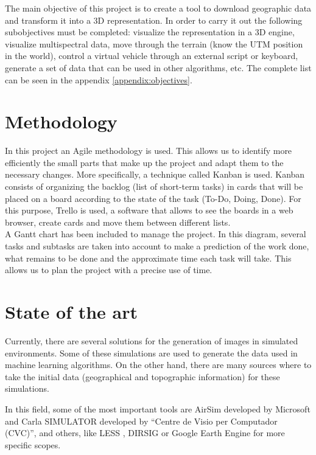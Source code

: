 \documentclass[10pt,a4paper,twocolumn,twoside]{article}
\begin{document}
The main objective of this project is to create a tool to download geographic data and transform it into a 3D representation. In order to carry it out the following subobjectives must be completed: visualize the representation in a 3D engine, visualize multispectral data, move through the terrain (know the UTM position in the world), control a virtual vehicle through an external script or keyboard, generate a set of data that can be used in other algorithms, etc. The complete list can be seen in the appendix \ref{appendix:objectives}.

\section{Methodology}
In this project an Agile methodology is used. This allows us to identify more efficiently the small parts that make up the project and adapt them to the necessary changes. More specifically, a technique called Kanban \cite{kanban} is used. Kanban consists of organizing the backlog (list of short-term tasks) in cards that will be placed on a board according to the state of the task (To-Do, Doing, Done). For this purpose, Trello \cite{trello} is used, a software that allows to see the boards in a web browser, create cards and move them between different lists.
\\
A Gantt chart has been included to manage the project. In this diagram, several tasks and subtasks are taken into account to make a prediction of the work done, what remains to be done and the approximate time each task will take. This allows us to plan the project with a precise use of time.

\section{State of the art}
\label{estatart}

Currently, there are several solutions for the generation of images in simulated environments. Some of these simulations are used to generate the data used in machine learning algorithms. On the other hand, there are many sources where to take the initial data (geographical and topographic information) for these simulations.

In this field, some of the most important tools are AirSim \cite{airsim} developed by Microsoft and Carla SIMULATOR \cite{carla} developed by ``Centre de Visio per Computador (CVC)'', and others, like LESS \cite{less}, DIRSIG \cite{dirsig} or Google Earth Engine \cite{googleearth} for more specific scopes.
\end{document}
